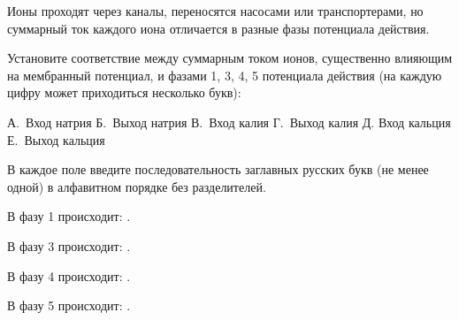 
Ионы проходят через каналы, переносятся насосами или транспортерами, но суммарный ток каждого иона отличается в разные фазы потенциала действия.

Установите соответствие между суммарным током ионов, существенно влияющим на мембранный потенциал, и фазами 1, 3, 4, 5 потенциала действия (на каждую цифру может приходиться несколько букв):


А. Вход натрия
Б. Выход натрия
В. Вход калия
Г. Выход калия
Д. Вход кальция
Е. Выход кальция

В каждое поле введите последовательность заглавных русских букв (не менее одной) в алфавитном порядке без разделителей.

В фазу 1 происходит: \underline{\hspace{2in}}. 

В фазу 3 происходит: \underline{\hspace{2in}}. 

В фазу 4 происходит: \underline{\hspace{2in}}. 

В фазу 5 происходит: \underline{\hspace{2in}}.